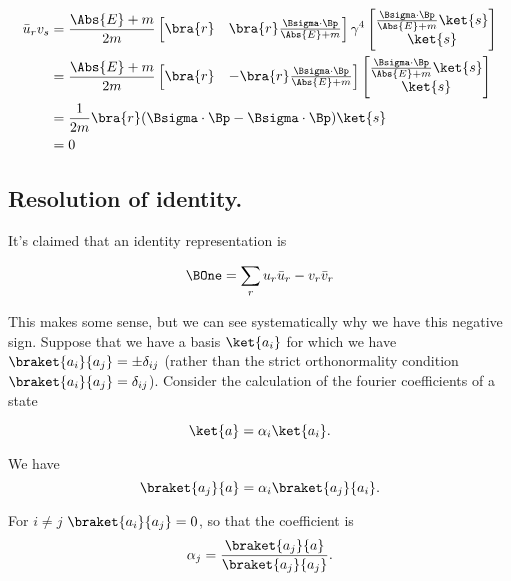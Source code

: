 \begin{align*}
\bar{u}_r v_s 
&= 
\frac{\Abs{E} + m}{2m}
\begin{bmatrix}
\bra{r} &
\bra{r} \frac{\Bsigma \cdot \Bp}{\Abs{E} + m} 
\end{bmatrix}
\gamma^4
\begin{bmatrix}
\frac{\Bsigma \cdot \Bp}{\Abs{E} + m} \ket{s} \\
\ket{s} 
\end{bmatrix} \\
&= 
\frac{\Abs{E} + m}{2m}
\begin{bmatrix}
\bra{r} &
-\bra{r} \frac{\Bsigma \cdot \Bp}{\Abs{E} + m} 
\end{bmatrix}
\begin{bmatrix}
\frac{\Bsigma \cdot \Bp}{\Abs{E} + m} \ket{s} \\
\ket{s} 
\end{bmatrix} \\
&=
\frac{1}{2m}
\bra{r} ( \Bsigma \cdot \Bp - \Bsigma \cdot \Bp ) \ket{s} \\
&= 0
\end{align*}

\subsection{Resolution of identity.}

It's claimed that an identity representation is

\begin{equation}\label{eqn:desaiDiracAdjoint:540}
\BOne = \sum_r u_r \bar{u}_r - v_r \bar{v}_r
\end{equation}

This makes some sense, but we can see systematically why we have this negative sign.  Suppose that we have a basis $\ket{a_i}$ for which we have $\braket{a_i}{a_j} = \pm \delta_{ij}$ (rather than the strict orthonormality condition $\braket{a_i}{a_j} = \delta_{ij}$).  Consider the calculation of the fourier coefficients of a state

\begin{equation}\label{eqn:desaiDiracAdjoint:560}
\ket{a} = \alpha_i \ket{a_i}.
\end{equation}

We have 
\begin{equation}\label{eqn:desaiDiracAdjoint:580}
\braket{a_j}{a} = \alpha_i \braket{a_j}{a_i}.
\end{equation}

For $i \ne j$ $\braket{a_i}{a_j} = 0$, so that the coefficient is
\begin{equation}\label{eqn:desaiDiracAdjoint:600}
\alpha_j =
\frac{\braket{a_j}{a}}{\braket{a_j}{a_j}}.
\end{equation}

